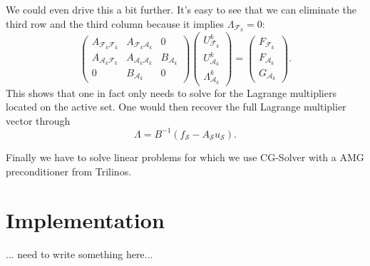 \documentclass{article}
\begin{document}
We could even drive this a bit further.
It's easy to see that we can eliminate the third row and the third column
because it implies $\Lambda_{\mathcal{F}_k} = 0$:
\begin{equation*}
\begin{pmatrix}
 A_{\mathcal{F}_k\mathcal{F}_k} & A_{\mathcal{F}_k\mathcal{A}_k} & 0\\
 A_{\mathcal{A}_k\mathcal{F}_k} & A_{\mathcal{A}_k\mathcal{A}_k} & B_{\mathcal{A}_k}\\
 0 & B_{\mathcal{A}_k} & 0
\end{pmatrix}
\begin{pmatrix}
 U^k_{\mathcal{F}_k}\\ U^k_{\mathcal{A}_k}\\ \Lambda^k_{\mathcal{A}_k}
\end{pmatrix}
=
\begin{pmatrix}
 F_{\mathcal{F}_k}\\ F_{\mathcal{A}_k}\\ G_{\mathcal{A}_k}
\end{pmatrix}.
\end{equation*}
This shows that one in fact only needs to solve for the Lagrange multipliers
located on the active set. One would then recover the full Lagrange multiplier
vector through
\begin{equation*}
 \Lambda = B^{-1}\left(f_{\mathcal{S}} - A_{\mathcal{S}}u_{\mathcal{S}}\right).
\end{equation*}

Finally we have to solve linear problems for which we use CG-Solver with a AMG
preconditioner from Trilinos.


\section{Implementation}

... need to write something here...
\end{document}
